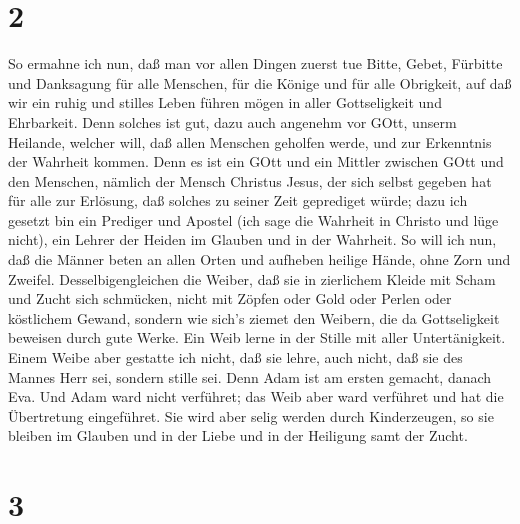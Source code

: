 \hypertarget{section-1}{%
\section{2}\label{section-1}}

 So ermahne ich nun, daß man vor allen Dingen zuerst tue
Bitte, Gebet, Fürbitte und Danksagung für alle Menschen, 
für die Könige und für alle Obrigkeit, auf daß wir ein ruhig und stilles
Leben führen mögen in aller Gottseligkeit und Ehrbarkeit. 
Denn solches ist gut, dazu auch angenehm vor GOtt, unserm Heilande,
 welcher will, daß allen Menschen geholfen werde, und zur
Erkenntnis der Wahrheit kommen.  Denn es ist ein GOtt und
ein Mittler zwischen GOtt und den Menschen, nämlich der Mensch Christus
Jesus,  der sich selbst gegeben hat für alle zur Erlösung,
daß solches zu seiner Zeit geprediget würde;  dazu ich
gesetzt bin ein Prediger und Apostel (ich sage die Wahrheit in Christo
und lüge nicht), ein Lehrer der Heiden im Glauben und in der Wahrheit.
 So will ich nun, daß die Männer beten an allen Orten und
aufheben heilige Hände, ohne Zorn und Zweifel. 
Desselbigengleichen die Weiber, daß sie in zierlichem Kleide mit Scham
und Zucht sich schmücken, nicht mit Zöpfen oder Gold oder Perlen oder
köstlichem Gewand,  sondern wie sich's ziemet den Weibern,
die da Gottseligkeit beweisen durch gute Werke.  Ein Weib
lerne in der Stille mit aller Untertänigkeit.  Einem Weibe
aber gestatte ich nicht, daß sie lehre, auch nicht, daß sie des Mannes
Herr sei, sondern stille sei.  Denn Adam ist am ersten
gemacht, danach Eva.  Und Adam ward nicht verführet; das
Weib aber ward verführet und hat die Übertretung eingeführet.
 Sie wird aber selig werden durch Kinderzeugen, so sie
bleiben im Glauben und in der Liebe und in der Heiligung samt der Zucht.

\hypertarget{section-2}{%
\section{3}\label{section-2}}

